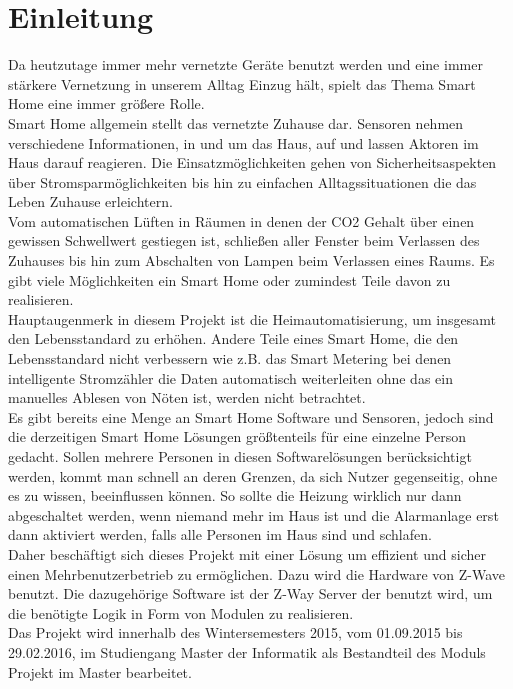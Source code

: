 \documentclass[12pt, oneside, smallheadings]{scrbook}
\begin{document}
\chapter{Einleitung} 
Da heutzutage immer mehr vernetzte Geräte benutzt werden und eine immer stärkere Vernetzung in unserem Alltag Einzug hält, spielt das Thema Smart Home eine immer größere Rolle.\\
Smart Home allgemein stellt das vernetzte Zuhause dar. Sensoren nehmen verschiedene Informationen, in und um das Haus, auf und lassen Aktoren im Haus darauf reagieren. Die Einsatzmöglichkeiten gehen von Sicherheitsaspekten über Stromsparmöglichkeiten bis hin zu einfachen Alltagssituationen die das Leben Zuhause erleichtern.\\
Vom automatischen Lüften in Räumen in denen der CO2 Gehalt über einen gewissen Schwellwert gestiegen ist, schließen aller Fenster beim Verlassen des Zuhauses bis hin zum Abschalten von Lampen beim Verlassen eines Raums. Es gibt viele Möglichkeiten ein Smart Home oder zumindest Teile davon zu realisieren.\\
Hauptaugenmerk in diesem Projekt ist die Heimautomatisierung, um insgesamt den Lebensstandard zu erhöhen. Andere Teile eines Smart Home, die den Lebensstandard nicht verbessern wie z.B. das Smart Metering bei denen intelligente Stromzähler die Daten automatisch weiterleiten ohne das ein manuelles Ablesen von Nöten ist, werden nicht betrachtet.\\
Es gibt bereits eine Menge an Smart Home Software und Sensoren, jedoch sind die derzeitigen Smart Home Lösungen größtenteils für eine einzelne Person gedacht. Sollen mehrere Personen in diesen Softwarelösungen berücksichtigt werden, kommt man schnell an deren Grenzen, da sich Nutzer gegenseitig, ohne es zu wissen, beeinflussen können. So sollte die Heizung wirklich nur dann abgeschaltet werden, wenn niemand mehr im Haus ist und die Alarmanlage erst dann aktiviert werden, falls alle Personen im Haus sind und schlafen.\\
Daher beschäftigt sich dieses Projekt mit einer Lösung um effizient und sicher einen Mehrbenutzerbetrieb zu ermöglichen. Dazu wird die Hardware von Z-Wave benutzt. Die dazugehörige Software ist der Z-Way Server der benutzt wird, um die benötigte Logik in Form von Modulen zu realisieren.\\
Das Projekt wird innerhalb des Wintersemesters 2015, vom 01.09.2015 bis 29.02.2016, im Studiengang Master der Informatik als Bestandteil des Moduls \glqq Projekt im Master\grqq{} bearbeitet.\\
\end{document}

